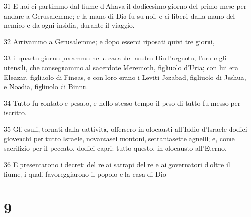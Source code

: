 \par 31 E noi ci partimmo dal fiume d'Ahava il dodicesimo giorno del primo mese per andare a Gerusalemme; e la mano di Dio fu su noi, e ci liberò dalla mano del nemico e da ogni insidia, durante il viaggio.
\par 32 Arrivammo a Gerusalemme; e dopo esserci riposati quivi tre giorni,
\par 33 il quarto giorno pesammo nella casa del nostro Dio l'argento, l'oro e gli utensili, che consegnammo al sacerdote Meremoth, figliuolo d'Uria; con lui era Eleazar, figliuolo di Fineas, e con loro erano i Leviti Jozabad, figliuolo di Jeshua, e Noadia, figliuolo di Binnu.
\par 34 Tutto fu contato e pesato, e nello stesso tempo il peso di tutto fu messo per iscritto.
\par 35 Gli esuli, tornati dalla cattività, offersero in olocausti all'Iddio d'Israele dodici giovenchi per tutto Israele, novantasei montoni, settantasette agnelli; e, come sacrifizio per il peccato, dodici capri: tutto questo, in olocausto all'Eterno.
\par 36 E presentarono i decreti del re ai satrapi del re e ai governatori d'oltre il fiume, i quali favoreggiarono il popolo e la casa di Dio.

\chapter{9}

